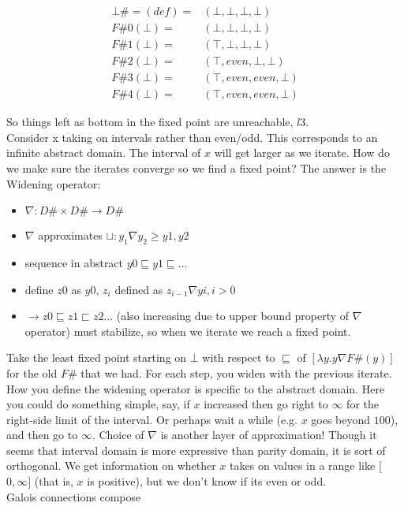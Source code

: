 \documentclass[11pt]{article}
\theoremstyle{definition}
\theoremstyle{plain}
\newcommand{\bottom}{\bot}
\begin{document}
\begin{align*}
\bottom\# =(def)= &(\bottom,\bottom,\bottom,\bottom)\\
F\#0(\bottom) = &(\bottom,\bottom,\bottom,\bottom)\\
F\#1(\bottom) = &(\top,\bottom,\bottom,\bottom)\\
F\#2(\bottom) = &(\top,even,\bottom,\bottom)\\ 
F\#3(\bottom) = &(\top,even,even,\bottom)\\
F\#4(\bottom) = &(\top,even,even,\bottom)
\end{align*}

\noindent So things left as bottom in the fixed point are unreachable, $l3$.\\

\noindent Consider x taking on intervals rather than even/odd. This corresponds to an infinite abstract domain.
The interval of $x$ will get larger as we iterate. How do we make sure the iterates converge so we find a fixed point?
The answer is the Widening operator:

\begin{itemize}
    \item $\nabla: D\# \times D\# \rightarrow  D\#$
    \item $\nabla$ approximates $\sqcup: y_1 \nabla y_2 \geq  y1,y2$
    \item sequence in abstract $y0 \sqsubseteq y1 \sqsubseteq ... $
    \item define $z0$ as $y0$, $z_i$ defined as  $z_{i-1} \nabla yi, i>0$
    \item $\rightarrow z0 \sqsubseteq z1 \sqsubset z2 ... $
    (also increasing due to upper bound property of $\nabla$ operator)
    must stabilize, so when we iterate we reach a fixed point.
\end{itemize}


\noindent Take the least fixed point starting on $\bottom$ with respect to $\sqsubseteq$ of $[\lambda y . y \nabla F\#(y)]$ 
for the old $F\#$ that we had. For each step, you widen with the previous iterate. How you define the widening operator is specific to the abstract domain.
Here you could do something simple, say, if $x$ increased then go right to $\infty$ for the right-side limit of the interval. 
Or perhaps wait a while (e.g. $x$ goes beyond $100$), and then go to $\infty$.
Choice of $\nabla$ is another layer of approximation! Though it seems that interval domain is more expressive than parity domain, it is sort of orthogonal.
We get information on whether $x$ takes on values in a range like [$0,\infty]$ (that is, $x$ is positive), but we don't know if its even or odd.\\

\noindent Galois connections compose
\end{document}
